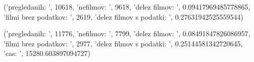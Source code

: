 ('pregledanih: ', 10618, 'nefilmov: ', 9618, 'delez filmov: ', 0.09417969485778865, 'filmi brez podatkov: ', 2619, 'delez filmov s podatki: ', 0.27631942525559544)

('pregledanih: ', 11776, 'nefilmov: ', 7799, 'delez filmov: ', 0.08491847826086957, 'filmi brez podatkov: ', 2977, 'delez filmov s podatki: ', 0.25144581342720645, 'cas: ', 15280.603897094727)